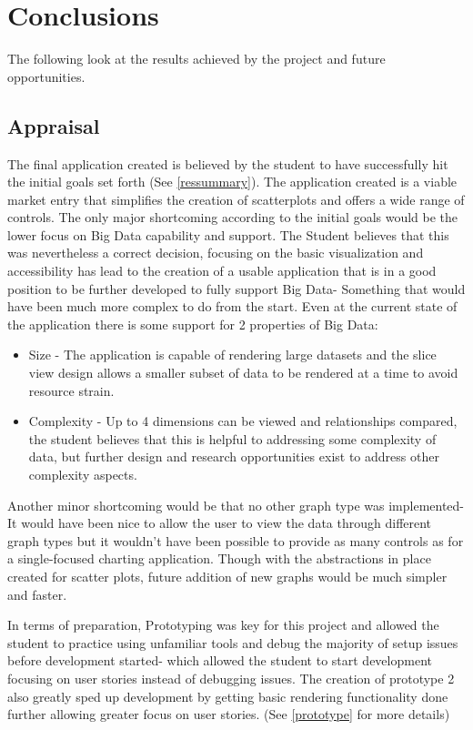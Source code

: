\section{Conclusions}
The following look at the results achieved by the project and future opportunities.

\subsection{Appraisal}
The final application created is believed by the student to have successfully hit the initial goals set forth (See \ref{ressummary}). The application created is a viable market entry that simplifies the creation of scatterplots and offers a wide range of controls. The only major shortcoming according to the initial goals would be the lower focus on Big Data capability and support. The Student believes that this was nevertheless a correct decision, focusing on the basic visualization and accessibility has lead to the creation of a usable application that is in a good position to be further developed to fully support Big Data- Something that would have been much more complex to do from the start. Even at the current state of the application there is some support for 2 properties \cite[]{6612229} of Big Data:
\begin{itemize}
    \item Size - The application is capable of rendering large datasets and the slice view design allows a smaller subset of data to be rendered at a time to avoid resource strain.
    \item Complexity -  Up to 4 dimensions can be viewed and relationships compared, the student believes that this is helpful to addressing some complexity of data, but further design and research opportunities exist to address other complexity aspects. \cite[]{6612229}
\end{itemize}

Another minor shortcoming would be that no other graph type was implemented- It would have been nice to allow the user to view the data through different graph types but it wouldn't have been possible to provide as many controls as for a single-focused charting application. Though with the abstractions in place created for scatter plots, future addition of new graphs would be much simpler and faster.

In terms of preparation, Prototyping was key for this project and allowed the student to practice using unfamiliar tools and debug the majority of setup issues before development started- which allowed the student to start development focusing on user stories instead of debugging issues. The creation of prototype 2 also greatly sped up development by getting basic rendering functionality done further allowing greater focus on user stories. (See \ref{prototype} for more details)

